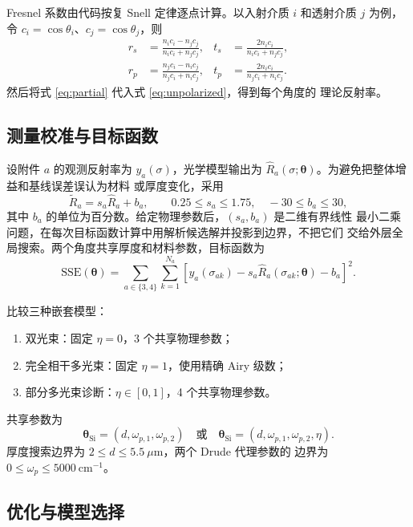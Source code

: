 \documentclass[UTF8,12pt,a4paper]{ctexart}
\begin{document}
Fresnel 系数由代码按复 Snell 定律逐点计算。以入射介质 $i$ 和透射介质 $j$
为例，令 $c_i=\cos\theta_i$、$c_j=\cos\theta_j$，则
\begin{align}
 r_s&=\frac{n_ic_i-n_jc_j}{n_ic_i+n_jc_j},
 &t_s&=\frac{2n_ic_i}{n_ic_i+n_jc_j},\\
 r_p&=\frac{n_jc_i-n_ic_j}{n_jc_i+n_ic_j},
 &t_p&=\frac{2n_ic_i}{n_jc_i+n_ic_j}.
 \label{eq:fresnel}
\end{align}
然后将式 \eqref{eq:partial} 代入式 \eqref{eq:unpolarized}，得到每个角度的
理论反射率。

\subsection{测量校准与目标函数}

设附件 $a$ 的观测反射率为 $y_a(\sigma)$，光学模型输出为
$\widehat R_a(\sigma;\bm\theta)$。为避免把整体增益和基线误差误认为材料
或厚度变化，采用
\begin{equation}
  \widetilde R_a=s_a\widehat R_a+b_a,
  \qquad 0.25\le s_a\le1.75,\quad -30\le b_a\le30,
  \label{eq:calibration}
\end{equation}
其中 $b_a$ 的单位为百分数。给定物理参数后，$(s_a,b_a)$ 是二维有界线性
最小二乘问题，在每次目标函数计算中用解析候选解并投影到边界，不把它们
交给外层全局搜索。两个角度共享厚度和材料参数，目标函数为
\begin{equation}
  \mathrm{SSE}(\bm\theta)=
  \sum_{a\in\{3,4\}}\sum_{k=1}^{N_a}
  \left[y_a(\sigma_{ak})-s_a\widehat R_a(\sigma_{ak};\bm\theta)-b_a\right]^2.
  \label{eq:objective}
\end{equation}

比较三种嵌套模型：
\begin{enumerate}[label=(\arabic*)]
  \item 双光束：固定 $\eta=0$，3 个共享物理参数；
  \item 完全相干多光束：固定 $\eta=1$，使用精确 Airy 级数；
  \item 部分多光束诊断：$\eta\in[0,1]$，4 个共享物理参数。
\end{enumerate}
\noindent
共享参数为
\[
\bm\theta_{\mathrm{Si}}=(d,\omega_{p,1},\omega_{p,2})
\quad\text{或}\quad
\bm\theta_{\mathrm{Si}}=(d,\omega_{p,1},\omega_{p,2},\eta).
\]
厚度搜索边界为 $2\le d\le5.5\ \mu\mathrm{m}$，两个 Drude 代理参数的
边界为 $0\le\omega_p\le5000\ \mathrm{cm}^{-1}$。

\subsection{优化与模型选择}
\end{document}
